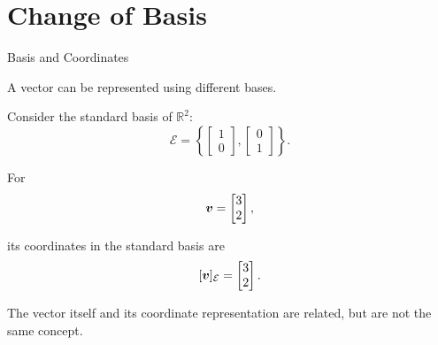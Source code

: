 

\section{Change of Basis}


\begin{frame}{Basis and Coordinates}

A vector can be represented using different bases.

Consider the standard basis of $\mathbb{R}^2$:
\vspace{-0.1cm}
\[
\mathcal{E}
=
\left\{
\begin{bmatrix}
1\\0
\end{bmatrix},
\begin{bmatrix}
0\\1
\end{bmatrix}
\right\}.
\]

For
\vspace{-0.1cm}
\[
\bm{v}
=
\begin{bmatrix}
3\\2
\end{bmatrix},
\]

its coordinates in the standard basis are
\vspace{-0.1cm}
\[
[\bm{v}]_{\mathcal{E}}
=
\begin{bmatrix}
3\\2
\end{bmatrix}.
\]

The vector itself and its coordinate representation
are related, but are not the same concept.

\end{frame}



